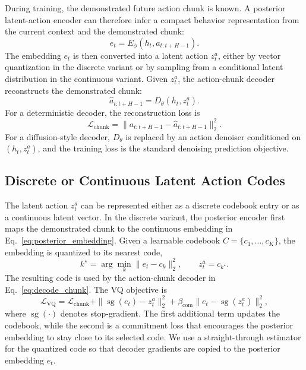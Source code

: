\documentclass[10pt]{article}
\newcommand{\sg}{\operatorname{sg}}
\begin{document}
During training, the demonstrated future action chunk is known. A posterior latent-action encoder can therefore infer a compact behavior representation from the current context and the demonstrated chunk:
\begin{equation}
 e_t = E_\phi(h_t,a_{t:t+H-1}).
 \label{eq:posterior_embedding}
\end{equation}
The embedding $e_t$ is then converted into a latent action $z_t^a$, either by vector quantization in the discrete variant or by sampling from a conditional latent distribution in the continuous variant. Given $z_t^a$, the action-chunk decoder reconstructs the demonstrated chunk:
\begin{equation}
 \hat{a}_{t:t+H-1}=D_\theta(h_t,z_t^a).
 \label{eq:decode_chunk}
\end{equation}
For a deterministic decoder, the reconstruction loss is
\begin{equation}
 \mathcal{L}_{\mathrm{chunk}} = \|a_{t:t+H-1}-\hat{a}_{t:t+H-1}\|_2^2.
 \label{eq:chunk_loss}
\end{equation}
For a diffusion-style decoder, $D_\theta$ is replaced by an action denoiser conditioned on $(h_t,z_t^a)$, and the training loss is the standard denoising prediction objective.

\subsection{Discrete or Continuous Latent Action Codes}

The latent action $z_t^a$ can be represented either as a discrete codebook entry or as a continuous latent vector. In the discrete variant, the posterior encoder first maps the demonstrated chunk to the continuous embedding in Eq.~\ref{eq:posterior_embedding}. Given a learnable codebook $C=\{c_1,\ldots,c_K\}$, the embedding is quantized to its nearest code,
\begin{equation}
 k^\star=\arg\min_k \|e_t-c_k\|_2^2,\qquad z_t^a=c_{k^\star}.
 \label{eq:vq_quantize}
\end{equation}
The resulting code is used by the action-chunk decoder in Eq.~\ref{eq:decode_chunk}. The VQ objective is
\begin{equation}
\mathcal{L}_{\mathrm{VQ}}=
\mathcal{L}_{\mathrm{chunk}}
+\|\sg(e_t)-z_t^a\|_2^2
+\beta_{\mathrm{com}}\|e_t-\sg(z_t^a)\|_2^2,
\label{eq:vq_loss}
\end{equation}
where $\sg(\cdot)$ denotes stop-gradient. The first additional term updates the codebook, while the second is a commitment loss that encourages the posterior embedding to stay close to its selected code. We use a straight-through estimator for the quantized code so that decoder gradients are copied to the posterior embedding $e_t$.
\end{document}

